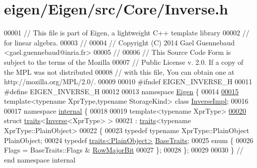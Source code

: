 \hypertarget{eigen_2_eigen_2src_2_core_2_inverse_8h_source}{}\section{eigen/\+Eigen/src/\+Core/\+Inverse.h}
\label{eigen_2_eigen_2src_2_core_2_inverse_8h_source}

\begin{DoxyCode}
00001 \textcolor{comment}{// This file is part of Eigen, a lightweight C++ template library}
00002 \textcolor{comment}{// for linear algebra.}
00003 \textcolor{comment}{//}
00004 \textcolor{comment}{// Copyright (C) 2014 Gael Guennebaud <gael.guennebaud@inria.fr>}
00005 \textcolor{comment}{//}
00006 \textcolor{comment}{// This Source Code Form is subject to the terms of the Mozilla}
00007 \textcolor{comment}{// Public License v. 2.0. If a copy of the MPL was not distributed}
00008 \textcolor{comment}{// with this file, You can obtain one at http://mozilla.org/MPL/2.0/.}
00009 
00010 \textcolor{preprocessor}{#ifndef EIGEN\_INVERSE\_H}
00011 \textcolor{preprocessor}{#define EIGEN\_INVERSE\_H}
00012 
00013 \textcolor{keyword}{namespace }\hyperlink{namespace_eigen}{Eigen} \{ 
00014 
\hyperlink{class_eigen_1_1_inverse_impl}{00015} \textcolor{keyword}{template}<\textcolor{keyword}{typename} XprType,\textcolor{keyword}{typename} StorageKind> \textcolor{keyword}{class }\hyperlink{class_eigen_1_1_inverse_impl}{InverseImpl};
00016 
00017 \textcolor{keyword}{namespace }\hyperlink{namespaceinternal}{internal} \{
00018 
00019 \textcolor{keyword}{template}<\textcolor{keyword}{typename} XprType>
\hyperlink{struct_eigen_1_1internal_1_1traits_3_01_inverse_3_01_xpr_type_01_4_01_4}{00020} \textcolor{keyword}{struct }\hyperlink{struct_eigen_1_1internal_1_1traits}{traits}<\hyperlink{class_eigen_1_1_inverse}{Inverse}<XprType> >
00021   : \hyperlink{struct_eigen_1_1internal_1_1traits}{traits}<typename XprType::PlainObject>
00022 \{
00023   \textcolor{keyword}{typedef} \textcolor{keyword}{typename} XprType::PlainObject PlainObject;
00024   \textcolor{keyword}{typedef} \hyperlink{struct_eigen_1_1internal_1_1traits}{traits<PlainObject>} \hyperlink{struct_eigen_1_1internal_1_1traits}{BaseTraits};
00025   \textcolor{keyword}{enum} \{
00026     Flags = BaseTraits::Flags & \hyperlink{group__flags_gae4f56c2a60bbe4bd2e44c5b19cbe8762}{RowMajorBit}
00027   \};
00028 \};
00029 
00030 \} \textcolor{comment}{// end namespace internal}

\end{DoxyCode}
